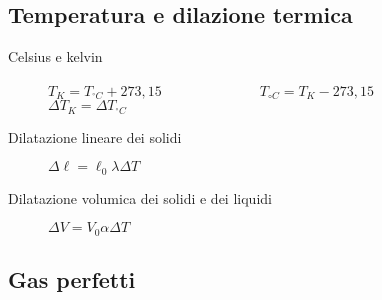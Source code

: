 \documentclass[a4paper,11pt,italian]{article}
\begin{document}
\subsection{Temperatura e dilazione termica}

\begin{description}
  \item[Celsius e kelvin] $ T_K = T_{^{\circ}C} + 273,15 $~~~~~~~~~~~~~~$ T_{{\circ}C} = T_{K} - 273,15 $~~~~~~~~~~~~~~$ \Delta T_K = \Delta T_{^{\circ}C} $
  
  \item[Dilatazione lineare dei solidi] $ \Delta \ell = \ell_0 \lambda \Delta T $%
  
  \item[Dilatazione volumica dei solidi e dei liquidi] $ \Delta V = V_0 \alpha \Delta T $%
\end{description}

\subsection{Gas perfetti}
\end{document}

